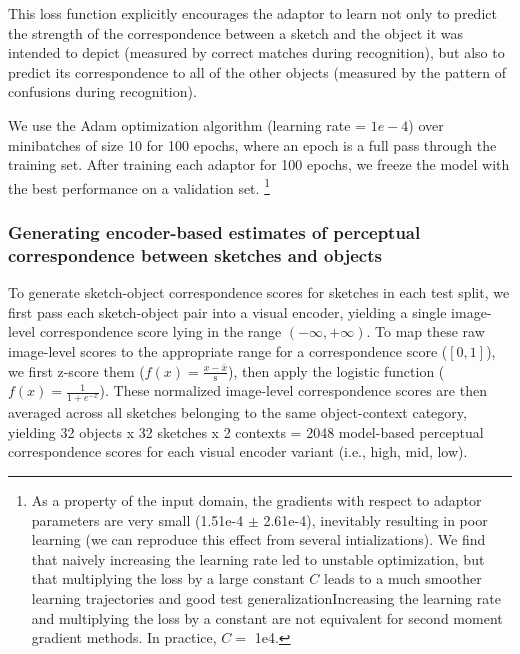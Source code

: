\documentclass[9pt,twocolumn,twoside]{pnas-new}
\begin{document}
{This loss function explicitly encourages the adaptor to learn not only to predict the strength of the correspondence between a sketch and the object it was intended to depict (measured by correct matches during recognition), but also to predict its correspondence to all of the other objects (measured by the pattern of confusions during recognition).

We use the Adam optimization algorithm \cite[]{kingma2014adam} (learning rate = $1e-4$) over minibatches of size 10 for 100 epochs, where an epoch is a full pass through the training set. 
After training each adaptor for 100 epochs, we freeze the model with the best performance on a validation set. \footnote{As a property of the input domain, the gradients with respect to adaptor parameters are very small (1.51e-4 $\pm$ 2.61e-4), inevitably resulting in poor learning (we can reproduce this effect from several intializations). We find that naively increasing the learning rate led to unstable optimization, but that multiplying the loss by a large constant $C$ leads to a much smoother learning trajectories and good test generalizationIncreasing the learning rate and multiplying the loss by a constant are not equivalent for second moment gradient methods. In practice, $C =$ 1e4.} 

\subsubsection*{Generating encoder-based estimates of perceptual correspondence between sketches and objects}

To generate sketch-object correspondence scores for sketches in each test split, we first pass each sketch-object pair into a visual encoder, yielding a single image-level correspondence score lying in the range $(-\infty,+\infty)$. 
To map these raw image-level scores to the appropriate range for a correspondence score ($[0,1]$), we first z-score them ($f(x) = \frac{x - \bar{x}}{\mathrm{s}}$), then apply the logistic function ($f(x)= \frac{1}{1+e^{-x}}$).
These normalized image-level correspondence scores are then averaged across all sketches belonging to the same object-context category, yielding 32 objects x 32 sketches x 2 contexts  = 2048 model-based perceptual correspondence scores for each visual encoder variant (i.e., high, mid, low).


}
\end{document}
